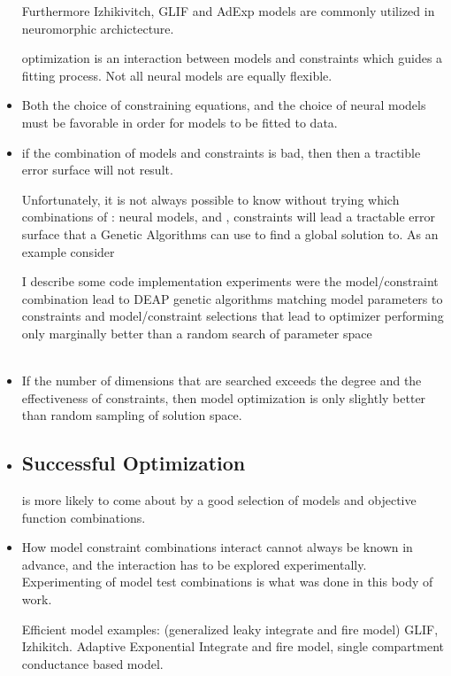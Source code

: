 \documentclass{article}
\begin{document}
\begin{itemize}
Furthermore Izhikivitch, GLIF and AdExp models are commonly utilized in neuromorphic archictecture.

\subitem optimization is an interaction between models and constraints which guides a fitting process. Not all neural models are equally flexible.  
\item  Both the choice of constraining equations, and the choice of neural models must be favorable in order for models to be fitted to data.
\item 
\subitem if the combination of models and constraints is bad, then then a tractible error surface will not result.  

\subsubitem Unfortunately, it is not always possible to know without trying which combinations of \subitem[A]: neural models, and \subitem[B], constraints will lead a tractable error surface that a Genetic Algorithms can use to find a global solution to. As an example consider  

I describe some code implementation experiments were the model/constraint combination lead to DEAP genetic algorithms matching model parameters to constraints and model/constraint selections that lead to optimizer performing only marginally better than a random search of parameter space\\
\\
\item If the number of dimensions that are searched exceeds the degree and the effectiveness of constraints, then model optimization is only slightly better than random sampling of solution space.

\item \subsection{Successful Optimization} is more likely to come about by a good selection of models and objective function combinations. 
\item How model constraint combinations interact cannot always be known in advance, and the interaction has to be explored experimentally. Experimenting of model test combinations is what was done in this body of work.

Efficient model examples: (generalized leaky integrate and fire model) GLIF, Izhikitch. Adaptive Exponential Integrate and fire model, single compartment conductance based model. 


\end{itemize}
\end{document}
